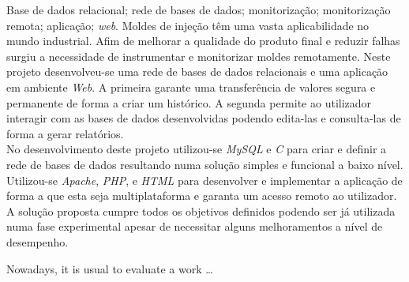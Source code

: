 \documentclass[11pt,twoside,a4paper]{report}
\begin{document}
\TitlePage
  \vspace*{55mm}
       {Base de dados relacional; rede de bases de dados; monitorização; monitorização remota; aplicação; \textit{web}.}
       {Moldes de injeção têm uma vasta aplicabilidade no mundo industrial. Afim de melhorar a qualidade do produto final e reduzir falhas surgiu a necessidade de instrumentar e monitorizar moldes remotamente. Neste projeto desenvolveu-se uma rede de bases de dados relacionais e uma aplicação em ambiente \textit{Web}. A primeira garante uma transferência de valores segura e permanente de forma a criar um histórico. A segunda permite ao utilizador interagir com as bases de dados desenvolvidas podendo edita-las e consulta-las de forma a gerar relatórios.\\
       	No desenvolvimento deste projeto utilizou-se \textit{MySQL} e \textit{C} para criar e definir a rede de bases de dados resultando numa solução simples e funcional a baixo nível. Utilizou-se \textit{Apache}, \textit{PHP}, e \textit{HTML} para desenvolver e implementar a aplicação de forma a que esta seja multiplataforma e garanta um acesso remoto ao utilizador.\\
       	A solução proposta cumpre todos os objetivos definidos podendo ser já utilizada numa fase experimental apesar de necessitar alguns melhoramentos a nível de desempenho.}
\EndTitlePage
\titlepage\ \endtitlepage %

\TitlePage
  \vspace*{55mm}
       {Nowadays, it is usual to evaluate a work \ldots}
\EndTitlePage
\titlepage\ \endtitlepage %


%
%

\tableofcontents

\cleardoublepage
\listoffigures

\cleardoublepage
\listoftables



\cleardoublepage
{}
\end{document}
